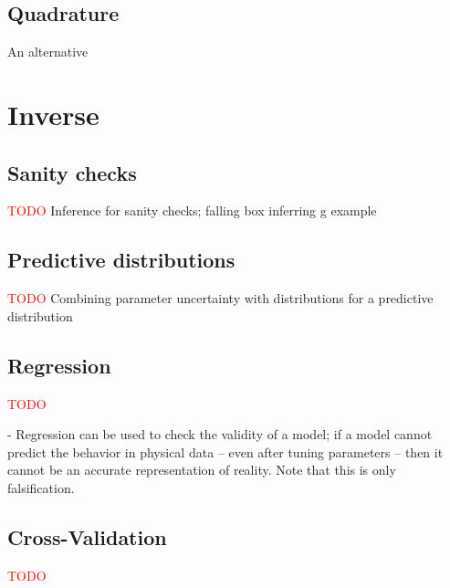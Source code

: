 \documentclass[../primer.tex]{subfiles}
\begin{document}
\subsection{Quadrature}
An alternative

\section{Inverse} \label{sec:inverse-propagation}

\subsection{Sanity checks}
\textcolor{red}{TODO} Inference for sanity checks; falling box inferring g example

\subsection{Predictive distributions}
\textcolor{red}{TODO} Combining parameter uncertainty with distributions for a
predictive distribution

\subsection{Regression}
\textcolor{red}{TODO}

- Regression can be used to check the validity of a model; if a model cannot
predict the behavior in physical data -- even after tuning parameters -- then it
cannot be an accurate representation of reality. Note that this is only
falsification.

\subsection{Cross-Validation}
\textcolor{red}{TODO}
\end{document}
